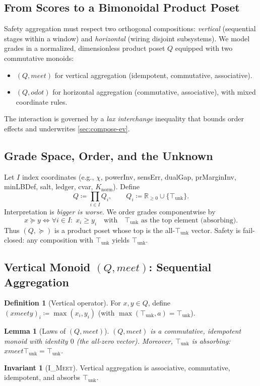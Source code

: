 \documentclass[11pt]{article}
\theoremstyle{plain}
\newtheorem{lemma}[theorem]{Lemma}
\theoremstyle{definition}
\newtheorem{definition}[theorem]{Definition}
\newtheorem{invariant}[theorem]{Invariant}
\theoremstyle{remark}
\newcommand{\RR}{\mathbb{R}}
\def\Q{Q}%
\def\vmeet{meet}%
\def\hplus{odot}%
\def\code#1{#1}%
\DeclareRobustCommand{\Q}{\texorpdfstring{\ensuremath{\mathcal{Q}}}{Q}}     %
\newcommand{\unk}{\top_{\mathrm{unk}}}         %
\newcommand{\vmeet}{\wedge}                    %
\newcommand{\hplus}{\odot}                     %
\newcommand{\geqQ}{\succeq}
\newcommand{\code}[1]{\texttt{\textup{#1}}}    %
\newcommand{\powerInv}{\code{powerInv}}
\newcommand{\prMarginInv}{\code{prMarginInv}}
\newcommand{\minLBDef}{\code{minLBDef}}
\newcommand{\dualGap}{\code{dualGap}}
\newcommand{\sensErr}{\code{sensErr}}
\newcommand{\ledger}{\code{ledger}}
\newcommand{\cvar}{\code{cvar}}
\newcommand{\knorm}{\ensuremath{K_{\mathrm{norm}}}}
\newcommand{\IMeet}{\textsc{I\_Meet}}
\def\Q{Q}%
\def\vmeet{meet}%
\def\hplus{odot}%
\def\code#1{#1}%
\begin{document}
\subsection{From Scores to a Bimonoidal Product Poset}
Safety aggregation must respect two orthogonal compositions: \emph{vertical} (sequential stages within a window) and \emph{horizontal} (wiring disjoint subsystems). We model grades in a normalized, dimensionless product poset $\Q$ equipped with two commutative monoids:
\begin{itemize}
  \item $(\Q,\vmeet)$ for vertical aggregation (idempotent, commutative, associative).
  \item $(\Q,\hplus)$ for horizontal aggregation (commutative, associative), with mixed coordinate rules.
\end{itemize}
The interaction is governed by a \emph{lax interchange} inequality that bounds order effects and underwrites \cref{sec:compose-ev}.

\subsection{Grade Space, Order, and the Unknown}
Let $I$ index coordinates (e.g., $\chi$, \powerInv, \sensErr, \dualGap, \prMarginInv, \minLBDef, \code{salt}, \ledger, \cvar, $\knorm$). Define
\[
  \Q \coloneqq \prod_{i\in I} Q_i, \qquad Q_i \coloneqq \RR_{\ge 0}\cup\{\unk\}.
\]
Interpretation is \emph{bigger is worse}. We order grades componentwise by
\[
  x \geqQ y \iff \forall i\in I:\; x_i \ge y_i \quad\text{with}\quad \unk \text{ as the top element (absorbing)}.
\]
Thus $(\Q,\geqQ)$ is a product poset whose top is the all-$\unk$ vector. Safety is fail-closed: any composition with $\unk$ yields $\unk$.

\subsection{Vertical Monoid $(\Q,\vmeet)$: Sequential Aggregation}
\begin{definition}[Vertical operator]
For $x,y\in\Q$, define $(x\vmeet y)_i \coloneqq \max(x_i,y_i)$ (with $\max(\unk,a)=\unk$).
\end{definition}
\begin{lemma}[Laws of $(\Q,\vmeet)$]\label{lem:meet-laws}
$(\Q,\vmeet)$ is a commutative, idempotent monoid with identity $0$ (the all-zero vector). Moreover, $\unk$ is absorbing: $x\vmeet\unk=\unk$.
\end{lemma}
\begin{invariant}[\IMeet]
Vertical aggregation is associative, commutative, idempotent, and absorbs $\unk$.
\end{invariant}
\end{document}
